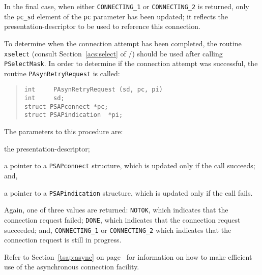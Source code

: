 In the final case, when either \verb"CONNECTING_1" or
\verb"CONNECTING_2" is returned,
only the \verb"pc_sd" element of the \verb"pc" parameter has been updated;
it reflects the presentation-descriptor to be used to reference this
connection.

To determine when the connection attempt has been completed,
the routine \verb"xselect" (consult Section~\ref{acs:select} of \volone/)
should be used after calling \verb"PSelectMask".
In order to determine if the connection attempt was successful,
the routine \verb"PAsynRetryRequest" is called:
\begin{quote}\small\begin{verbatim}
int     PAsynRetryRequest (sd, pc, pi)
int     sd;
struct PSAPconnect *pc;
struct PSAPindication  *pi;
\end{verbatim}\end{quote}
The parameters to this procedure are:
\begin{describe}
\item[\verb"sd":] the presentation-descriptor;

\item[\verb"pc":] a pointer to a \verb"PSAPconnect" structure, which is
updated only if the call succeeds;
and,

\item[\verb"pi":] a pointer to a \verb"PSAPindication" structure, which is
updated only if the call fails.
\end{describe}
Again, one of three values are returned:
\verb"NOTOK", which indicates that the connection request failed;
\verb"DONE", which indicates that the connection request succeeded;
and, \verb"CONNECTING_1" or \verb"CONNECTING_2" which indicates that
the connection request is still in progress.

Refer to Section~\ref{tsap:async} on page~\pageref{tsap:async}
for information on how to make efficient use of the asynchronous connection
facility. 

